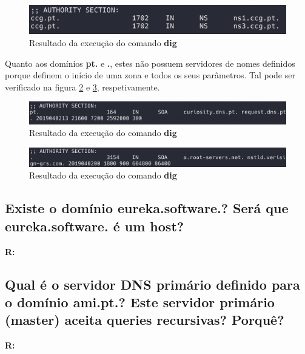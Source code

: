 \documentclass{llncs}
\begin{document}
\begin{figure}[H]
\begin{center}
\includegraphics[scale=0.4]{1c1.png}
\end{center}
\caption{\label{fig:1c1}Resultado da execução do comando \textbf{dig}}
\end{figure}

Quanto aos domínios \textbf{pt.} e \textbf{.}, estes não possuem servidores de nomes definidos porque definem o início de uma zona e todos os seus parâmetros. Tal pode ser verificado na figura \ref{fig:1c2} e \ref{fig:1c3}, respetivamente.

\begin{figure}[H]
\begin{center}
\includegraphics[scale=0.4]{1c2.png}
\end{center}
\caption{\label{fig:1c2}Resultado da execução do comando \textbf{dig}}
\end{figure}

\begin{figure}[H]
\begin{center}
\includegraphics[scale=0.4]{1c3.png}
\end{center}
\caption{\label{fig:1c3}Resultado da execução do comando \textbf{dig}}
\end{figure}


\subsection{\textbf{Existe o domínio eureka.software.? Será que eureka.software. é um host?}}
\textbf{R:}


\subsection{\textbf{Qual é o servidor DNS primário definido para o domínio ami.pt.? Este servidor primário (master) aceita queries recursivas? Porquê?}}
\textbf{R:}
\end{document}
